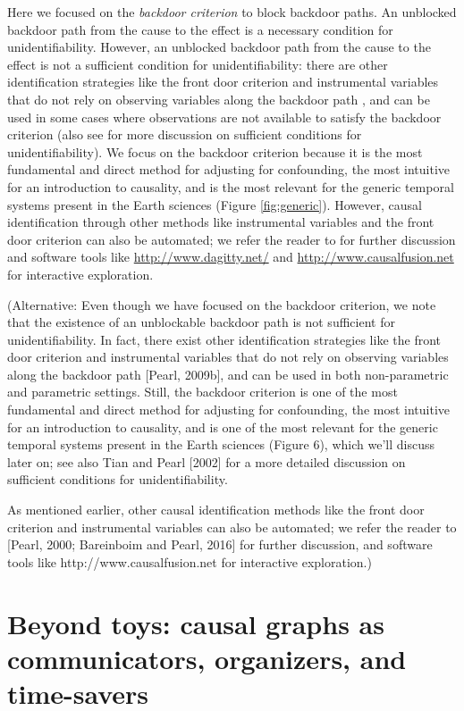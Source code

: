 \documentclass[12pt]{article}
\begin{document}
Here we focused on the \emph{backdoor criterion} to block backdoor
paths. An unblocked backdoor path from the cause to the effect is a
necessary condition for unidentifiability. However, an unblocked
backdoor path from the cause to the effect is not a sufficient
condition for unidentifiability: there are other identification
strategies like the front door criterion and instrumental variables
that do not rely on observing variables along the backdoor path
\citep{pearl2009causality}, and can be used in some cases where
observations are not available to satisfy the backdoor criterion (also
see \citet{tian2002general} for more discussion on sufficient
conditions for unidentifiability). We focus on the backdoor criterion
because it is the most fundamental and direct method for adjusting for
confounding, the most intuitive for an introduction to causality, and
is the most relevant for the generic temporal systems present in the
Earth sciences (Figure \ref{fig:generic}). However, causal
identification through other methods like instrumental variables and
the front door criterion can also be automated; we refer the reader to
\citet{pearl2009causality} for further discussion and software tools
like \url{http://www.dagitty.net/} and
\url{http://www.causalfusion.net} for interactive exploration.

(Alternative: Even though we have focused on the backdoor criterion,
we note that the existence of an unblockable backdoor path is not
sufficient for unidentifiability. In fact, there exist other
identification strategies like the front door criterion and
instrumental variables that do not rely on observing variables along
the backdoor path [Pearl, 2009b], and can be used in both
non-parametric and parametric settings. Still, the backdoor criterion
is one of the most fundamental and direct method for adjusting for
confounding, the most intuitive for an introduction to causality, and
is one of the most relevant for the generic temporal systems present
in the Earth sciences (Figure 6), which we’ll discuss later on; see
also Tian and Pearl [2002] for a more detailed discussion on
sufficient conditions for unidentifiability.

As mentioned earlier, other causal identification methods like the
front door criterion and instrumental variables can also be automated;
we refer the reader to [Pearl, 2000; Bareinboim and Pearl, 2016] for
further discussion, and software tools like
http://www.causalfusion.net for interactive exploration.)


\section{Beyond toys: causal graphs as communicators, organizers, and
  time-savers}\label{sec:causal-graphs-as}
\end{document}
